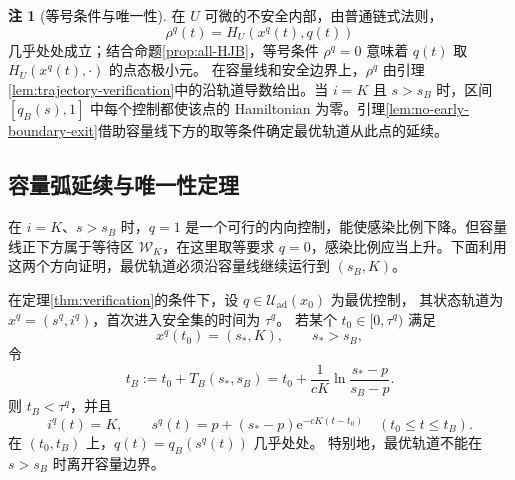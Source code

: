 \documentclass[lang=cn,a4paper,newtx]{elegantpaper}
\theoremstyle{plain}
\theoremstyle{definition}
\newtheorem{paperremark}[theorem]{注}
\newcommand{\Uad}{\mathcal U_{\mathrm{ad}}}
\newcommand{\e}{\mathrm e}
\begin{document}
\begin{paperremark}[等号条件与唯一性]
\label{rem:verification-equality-uniqueness}
在 $U$ 可微的不安全内部，由普通链式法则，
\[
\rho^q(t)=H_U(x^q(t),q(t))
\]
几乎处处成立；结合命题\ref{prop:all-HJB}，等号条件 $\rho^q=0$ 意味着 $q(t)$ 取 $H_U(x^q(t),\cdot)$ 的点态极小元。
在容量线和安全边界上，$\rho^q$ 由引理\ref{lem:trajectory-verification}中的沿轨道导数给出。当 $i=K$ 且 $s>s_B$ 时，区间 $[q_B(s),1]$ 中每个控制都使该点的 Hamiltonian 为零。引理\ref{lem:no-early-boundary-exit}借助容量线下方的取等条件确定最优轨道从此点的延续。
\end{paperremark}


\subsection{容量弧延续与唯一性定理}
\label{sec:constant-uniqueness}
在 $i=K$、$s>s_B$ 时，$q=1$ 是一个可行的内向控制，能使感染比例下降。但容量线正下方属于等待区 $\mathcal W_K$，在这里取等要求 $q=0$，感染比例应当上升。下面利用这两个方向证明，最优轨道必须沿容量线继续运行到 $(s_B,K)$。

\begin{lemma}[最优轨道在容量弧上的延续]
\label{lem:no-early-boundary-exit}
在定理\ref{thm:verification}的条件下，设 $q\in\Uad(x_0)$ 为最优控制，
其状态轨道为 $x^q=(s^q,i^q)$，首次进入安全集的时间为 $\tau^q$。
若某个 $t_0\in[0,\tau^q)$ 满足
\[
x^q(t_0)=(s_*,K),\qquad s_*>s_B,
\]
令
\[
t_B:=t_0+T_B(s_*,s_B)
=t_0+\frac1{cK}\ln\frac{s_*-p}{s_B-p}.
\]
则 $t_B<\tau^q$，并且
\begin{equation}
i^q(t)=K,\qquad
s^q(t)=p+(s_*-p)\e^{-cK(t-t_0)}
\quad(t_0\le t\le t_B).
\label{eq:optimal-boundary-continuation}
\end{equation}
在 $(t_0,t_B)$ 上，$q(t)=q_B(s^q(t))$ 几乎处处。
特别地，最优轨道不能在 $s>s_B$ 时离开容量边界。
\end{lemma}
\end{document}

